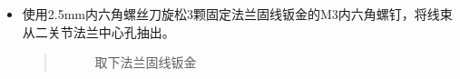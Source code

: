 \documentclass[a4paper,11pt,english,openany,oneside]{sphinxmanual}
\begin{document}
\begin{itemize}
\begin{itemize}
\item {} 
\sphinxAtStartPar
使用2.5mm内六角螺丝刀旋松3颗固定法兰固线钣金的M3内六角螺钉，将线束从二关节法兰中心孔抽出。
\begin{quote}

\begin{figure}[H]
\centering
\capstart

\noindent{}
\caption{取下法兰固线钣金}\label{\detokenize{_u66f4_u6362_u5173_u8282:id42}}\end{figure}
\end{quote}

\end{itemize}

\end{itemize}

\sphinxAtStartPar
{}
\end{document}
